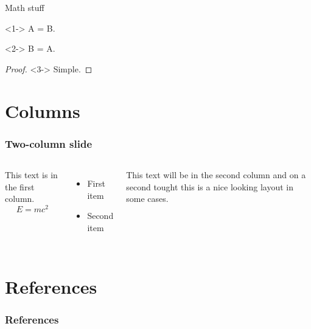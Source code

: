 \documentclass[mathserif,aspectratio=169]{beamer}
\begin{document}
\begin{frame}{Math stuff}
\begin{definition}<1->
A = B.
\end{definition}

\begin{theorem}<2->
B = A.
\end{theorem}

\begin{proof}<3->
Simple. 
\end{proof}
\end{frame}

\section{Columns}

\begin{frame}
\frametitle{Two-column slide}

\begin{columns}

This text is in the first column.
$$E=mc^2$$
\begin{itemize}
\item First item
\item Second item
\end{itemize}

This text will be in the second column
and on a second tought this is a nice looking
layout in some cases.
\end{columns}
\end{frame}

\section*{References}

\begin{frame}[allowframebreaks]
\frametitle{References}
    
    
\end{frame}
\end{document}
